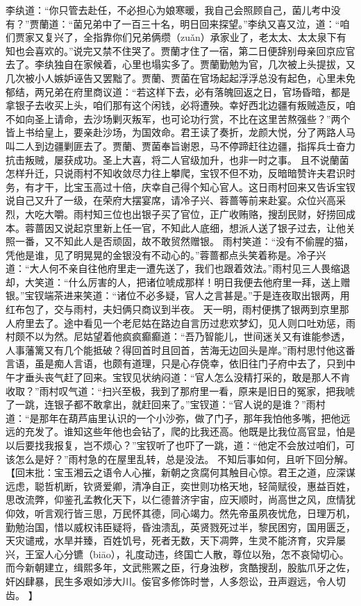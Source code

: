 \documentclass[12pt,oneside]{book}
\begin{document}
李纨道：“你只管去赴任，不必担心为娘寒暖，我自己会照顾自己，菌儿考中没有？”贾蘭道：“菌兄弟中了一百三十名，明日回来探望。”李纨又喜又泣，道：“咱们贾家又复兴了，全指靠你们兄弟俩缵（zuǎn）承家业了，老太太、太太泉下有知也会喜欢的。”说完又禁不住哭了。贾蘭才住了一宿，第二日便辞别母亲回京应官去了。李纨独自在家候着，心里也塌实多了。贾蘭勤勉为官，几次被上头提拔，又几次被小人嫉妒诬告又罢黜了。贾蘭、贾菌在官场起起浮浮总没有起色，心里未免郁结，两兄弟在府里商议道：“若这样下去，必有落魄回返之日，官场昏暗，都是拿银子去收买上头，咱们那有这个闲钱，必将遭殃。幸好西北边疆有叛贼造反，咱不如向圣上请命，去沙场剿灭叛军，也可论功行赏，不比在这里苦熬强些？”两个皆上书给皇上，要亲赴沙场，为国效命。君王读了奏折，龙颜大悦，分了两路人马叫二人到边疆剿匪去了。贾蘭、贾菌奉旨谢恩，马不停蹄赶往边疆，指挥兵士奋力抗击叛贼，屡获成功。圣上大喜，将二人官级加升，也非一时之事。
且不说蘭菌怎样升迁，只说雨村不知收敛尽力往上攀爬，宝钗不但不劝，反暗暗赞许夫君识时务，有才干，比宝玉高过十倍，庆幸自己得个知心官人。这日雨村回来又告诉宝钗说自己又升了一级，在荣府大摆宴席，请冷子兴、蓉蔷等前来赴宴。众位兴高采烈，大吃大嚼。雨村知三位也出银子买了官位，正广收贿赂，搜刮民财，好捞回成本。蓉蔷因又说起京里新上任一官，不知此人底细，想派人送了银子过去，让他关照一番，又不知此人是否顽固，故不敢贸然赠银。
雨村笑道：“没有不偷腥的猫，凭他是谁，见了明晃晃的金银没有不动心的。”蓉蔷都点头笑着称是。冷子兴道：“大人何不亲自往他府里走一遭先送了，我们也跟着效法。”雨村见三人畏缩退却，大笑道：“什么厉害的人，把诸位唬成那样！明日我便去他府里一拜，送上赠银。”宝钗端茶进来笑道：“诸位不必多疑，官人之言甚是。”于是连夜取出银两，用红布包了，交与雨村，夫妇俩只商议到半夜。
天一明，雨村便携了银两到京里那人府里去了。途中看见一个老尼姑在路边自言历过悲欢梦幻，见人则口吐劝惩，雨村颇不以为然。尼姑望着他疯疯癫癫道：“吾乃智能儿，世间迷关又有谁能参透，人事藩篱又有几个能抵破？得回首时且回首，苦海无边回头是岸。”雨村思忖他这番言语，虽是痴人言语，也颇有道理，只是心存侥幸，依旧往门子府中去了，只到中午才垂头丧气赶了回来。宝钗见状纳闷道：“官人怎么没精打采的，敢是那人不肯收取？”雨村叹气道：“扫兴至极，我到了那府里一看，原来是旧日的冤家，把我唬了一跳，连银子都不敢拿出，就赶回来了。”宝钗道：“官人说的是谁？”雨村道：“是那年在葫芦庙里认识的一个小沙弥，做了门子，那年我怕他多嘴，把他远远的充发了。谁知这些年他也会钻了，爬的比我还高。他既是比我位高官显，怕是以后要找我报复，岂不烦心？”宝钗听了也吓了一跳，道：“他定不会放过咱们，可该怎么是好？”雨村急的在屋里乱转，总是没法。
不知后事如何，且听下回分解。
【回末批：宝玉湘云之语令人心摧，新朝之贪腐何其触目心惊。君王之道，应深谋远虑，聪哲机断，钦贤爱卿，清净自正，奕世则功格天地，轻简赋役，惠益百姓，思改流弊，仰鉴孔孟教化天下，以仁德普济宇宙，应天顺时，尚高世之风，庶情犹仰效，听言观行皆三思，万民怀其德，同心竭力。然先帝虽夙夜忧危，日理万机，勤勉治国，惜以威权讳臣疑将，昏浊溃乱，英贤戮死过半，黎民困穷，国用匮乏，天灾谴戒，水旱并臻，百姓饥号，死者无数，天下凋弊，生灵不能济育，灾异屡兴，王室人心分镳（biāo），礼度动违，终国亡人散，尊位以殆，怎不哀恸切心。而今新朝建立，缉熙多年，文武熊罴之臣，行身浊秽，贪酷搜刮，股肱爪牙之佐，奸凶肆暴，民生多艰如涉大川。侫官多修饰时誉，人多怨讼，丑声遐远，令人切齿。 】
\end{document}
